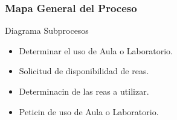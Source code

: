 \subsubsection{Mapa General del Proceso}			%
Diagrama
Subprocesos
\begin{itemize}
\item  Determinar el uso de Aula o Laboratorio.
\item  Solicitud de disponibilidad de reas.
\item  Determinacin de las reas a utilizar.
\item  Peticin de uso de Aula o Laboratorio.
\end{itemize}